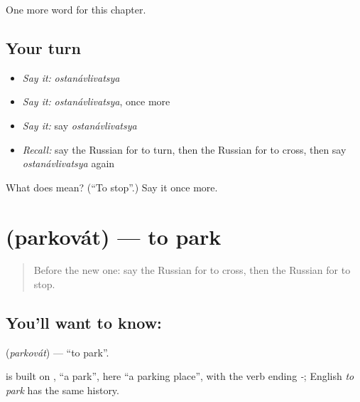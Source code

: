 \begin{grammarlens}[title={What you've built}]
One more word for this chapter.
\end{grammarlens}

\subsection*{Your turn}
\begin{itemize}
\raggedright
  \item \emph{Say it:} \emph{ostanávlivatsya}
  \item \emph{Say it:} \emph{ostanávlivatsya}, once more
  \item \emph{Say it:} say \emph{ostanávlivatsya}
  \item \emph{Recall:} say the Russian for to turn, then the Russian for to cross, then say \emph{ostanávlivatsya} again
\end{itemize}

\begin{tcolorbox}[breakable,colback=teal!4,colframe=teal!35!black,title={Before you move on}]
What does  mean? (\textquotedblleft{}To stop\textquotedblright{}.) Say it once more.
\end{tcolorbox}
\section[\texorpdfstring{\ru{парковать} (parkovát)}{парковать (parkovát)}]{ (parkovát) — to park}

\label{lesson:RU-C146-parkovat}



\begin{quote}
Before the new one: say the Russian for to cross, then the Russian for to stop.
\end{quote}

\subsection*{You'll want to know: }
\textbf{} (\emph{parkovát}) — \textquotedblleft{}to park\textquotedblright{}.

\begin{cousinweb}
\textbf{} is built on \emph{}, \textquotedblleft{}a park\textquotedblright{}, here \textquotedblleft{}a parking place\textquotedblright{}, with the verb ending \emph{-}; English \emph{to park} has the same history.
\end{cousinweb}

